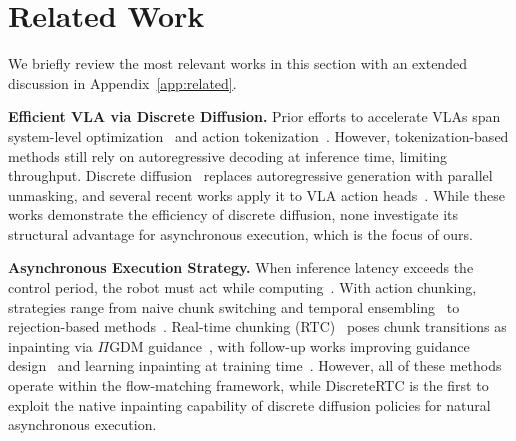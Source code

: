 \documentclass{article}
\begin{document}

\section{Related Work}
\label{sec:related}

We briefly review the most relevant works in this section with an extended discussion in Appendix~\ref{app:related}.

\textbf{Efficient VLA via Discrete Diffusion.}
Prior efforts to accelerate VLAs span system-level optimization~\citep{ma2025running} and action tokenization~\citep{pertsch2025fast, liu2026oat, intelligence2025pi_}.
However, tokenization-based methods still rely on autoregressive decoding at inference time, limiting throughput.
Discrete diffusion~\citep{lou2023discrete} replaces autoregressive generation with parallel unmasking, and several recent works apply it to VLA action heads~\citep{liang2025discrete, wen2025llada, wen2025dvla, chen2025unified, ye2025dream, chen2026dfm, song2026fast}.
While these works demonstrate the efficiency of discrete diffusion, none investigate its structural advantage for asynchronous execution, which is the focus of ours.

\textbf{Asynchronous Execution Strategy.}
When inference latency exceeds the control period, the robot must act while computing~\citep{xiao2020thinking}.
With action chunking, strategies range from naive chunk switching and temporal ensembling~\citep{zhao2023learning} to rejection-based methods~\citep{liu2024bidirectional}.
Real-time chunking (RTC)~\citep{black2025real} poses chunk transitions as inpainting via $\Pi$GDM guidance~\citep{song2023pseudoinverse}, with follow-up works improving guidance design~\citep{yang2026abpolicy, lu2026faster} and learning inpainting at training time~\citep{black2025training, wang2026real, liu2026learning}.
However, all of these methods operate within the flow-matching framework, 
while DiscreteRTC is the first to exploit the native inpainting capability of discrete diffusion policies for natural asynchronous execution.
\end{document}
